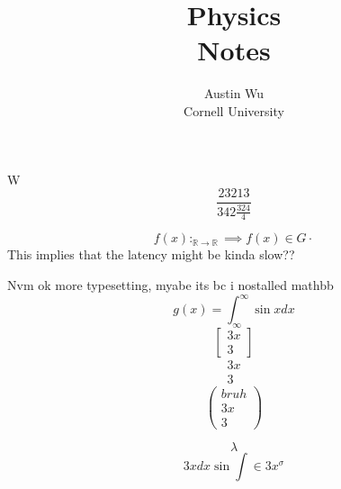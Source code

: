 \documentclass{report}
\title{\Huge{
            Physics
            }\\
            Notes
        }
\author{\huge{
        Austin Wu
    }\\ Cornell University}
\date{}
\begin{document}
    \maketitle
    \newpage%
    \tableofcontents \pagebreak 
   
    W
    \[
        \frac{23213}{342\frac{324}{4}}
    \]

    \[
        f(x):_{\mathbb{R} \to \mathbb{R}} \implies f(x) \in G\cdot
    \]
    This implies that the latency might be kinda slow??

    Nvm
    ok more typesetting, myabe its bc i nostalled mathbb
    \[
        g(x) = \int_\infty^\infty \sin x dx
    \]
    \[
    \begin{bmatrix}
        3x \\ 3
    \end{bmatrix}
    \]
    \[
    \begin{matrix}
        3x \\ 3
    \end{matrix}    
    \]
    \[\begin{pmatrix}
        bruh \\ 3x \\ 3
    \end{pmatrix}\]
    
    
    \[\lambda\]
    \[3x dx \sin \int \in 3x^\sigma\]
\end{document}
